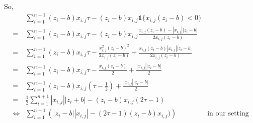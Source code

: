 \documentclass[11pt]{article}
\begin{document}
So,
\allowdisplaybreaks
\begin{align*}
 & \sum_{i=1}^{n+1} (z_{i}-b)x_{i,j}\tau-(z_{i}-b)x_{i,j}\mathds{1}\{x_{i,j}(z_{i}-b)<0\}  & \\
= & \sum_{i=1}^{n+1} (z_{i}-b)x_{i,j}\tau-(z_{i}-b)x_{i,j}\frac{x_{i,j}(z_{i}-b) - |x_{i,j}||z_{i}-b|}{2x_{i,j}(z_{i}-b)}  & \\
= & \sum_{i=1}^{n+1} (z_{i}-b)x_{i,j}\tau-\frac{x_{i,j}^{2}(z_{i}-b)^{2}}{2x_{i,j}(z_{i}-b)}+\frac{x_{i,j}(z_{i}-b)|x_{i,j}||z_{i}-b|}{2x_{i,j}(z_{i}-b)}  & \\
= & \sum_{i=1}^{n+1} (z_{i}-b)x_{i,j}\tau-\frac{x_{i,j}(z_{i}-b)}{2}+\frac{|x_{i,j}||z_{i}-b|}{2}  & \\
= & \sum_{i=1}^{n+1} (z_{i}-b)x_{i,j}(\tau-\frac{1}{2})+\frac{|x_{i,j}||z_{i}-b|}{2}  & \\
= & \frac{1}{2}\sum_{i=1}^{n+1} |x_{i,j}||z_{i}+b|-(z_{i}-b)x_{i,j}(2\tau-1)  & \\
\Leftrightarrow & \sum_{i=1}^{n+1}\left( |z_{i}-b| |x_{i,j}| - (2\tau-1)(z_{i}-b)x_{i,j}) \right)& \text{in our setting}\\
\end{align*}
\end{document}

